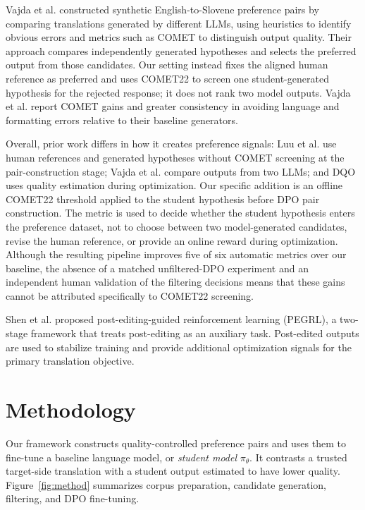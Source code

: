 \documentclass[conference]{IEEEtran}
\begin{document}
Vajda et al. \cite{b8} constructed synthetic English-to-Slovene preference pairs by comparing translations generated by different LLMs, using heuristics to identify obvious errors and metrics such as COMET to distinguish output quality. Their approach compares independently generated hypotheses and selects the preferred output from those candidates. Our setting instead fixes the aligned human reference as preferred and uses COMET22 to screen one student-generated hypothesis for the rejected response; it does not rank two model outputs. Vajda et al. report COMET gains and greater consistency in avoiding language and formatting errors relative to their baseline generators.

Overall, prior work differs in how it creates preference signals: Luu et al. use human references and generated hypotheses without COMET screening at the pair-construction stage; Vajda et al. compare outputs from two LLMs; and DQO uses quality estimation during optimization. Our specific addition is an offline COMET22 threshold applied to the student hypothesis before DPO pair construction. The metric is used to decide whether the student hypothesis enters the preference dataset, not to choose between two model-generated candidates, revise the human reference, or provide an online reward during optimization. Although the resulting pipeline improves five of six automatic metrics over our baseline, the absence of a matched unfiltered-DPO experiment and an independent human validation of the filtering decisions means that these gains cannot be attributed specifically to COMET22 screening.

Shen et al. \cite{b9} proposed post-editing-guided reinforcement learning (PEGRL), a two-stage framework that treats post-editing as an auxiliary task. Post-edited outputs are used to stabilize training and provide additional optimization signals for the primary translation objective.

\section{Methodology}
Our framework constructs quality-controlled preference pairs and uses them to fine-tune a baseline language model, or \textit{student model} $\pi_\theta$. It contrasts a trusted target-side translation with a student output estimated to have lower quality. Figure~\ref{fig:method} summarizes corpus preparation, candidate generation, filtering, and DPO fine-tuning.
\end{document}
